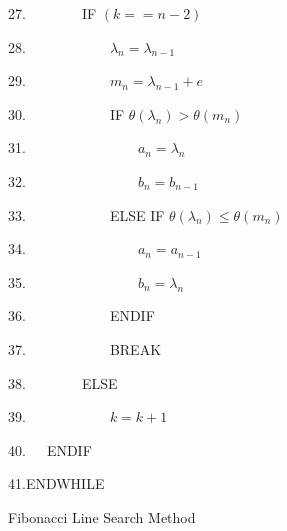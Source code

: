 \documentclass[times,12pt]{ACME2015article}
\newenvironment{lyxcode}
{\par\begin{list}{}{
\setlength{\rightmargin}{\leftmargin}
\setlength{\listparindent}{0pt}%
\raggedright
\setlength{\itemsep}{0pt}
\setlength{\parsep}{0pt}
\normalfont\ttfamily}%
 \item[]}
{\end{list}}
\begin{document}
\begin{algorithm}
\begin{lyxcode}
27.~~~~~~~~IF $(k == n-2)$

28.~~~~~~~~~~~~$\lambda_{n} = \lambda_{n-1}$
				
29.~~~~~~~~~~~~$m_{n} = \lambda_{n-1} + e$

30.~~~~~~~~~~~~IF $\theta (\lambda_{n}) > \theta (m_{n})$
					
31.~~~~~~~~~~~~~~~~$a_{n} = \lambda_{n}$
					
32.~~~~~~~~~~~~~~~~$b_{n} = b_{n-1}$ 

33.~~~~~~~~~~~~ELSE IF $\theta (\lambda_{n}) \leq \theta (m_{n})$
					
34.~~~~~~~~~~~~~~~~$a_{n} = a_{n-1}$
					
35.~~~~~~~~~~~~~~~~$b_{n} = \lambda_{n}$
					
36.~~~~~~~~~~~~ENDIF
				
37.~~~~~~~~~~~~BREAK

38.~~~~~~~~ELSE 

39.~~~~~~~~~~~~$k = k+1$

40.~~~ENDIF

41.ENDWHILE

\end{lyxcode}
\protect\caption{\label{alg8}Fibonacci Line Search Method}
\end{algorithm}

\clearpage
\end{document}
